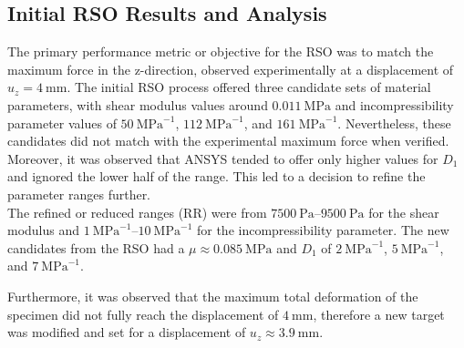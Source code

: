 \subsection*{Initial RSO Results and Analysis}
The primary performance metric or objective for the RSO was to match the maximum force in the z-direction, 
observed experimentally at a displacement of $u_z=\SI{4}{\milli\meter}$.
The initial RSO process offered three candidate sets of material parameters, with shear modulus values 
around $\SI{0.011}{\mega \pascal}$ and incompressibility parameter values of $\SI{50}{\mega\pascal\tothe{-1}}$, 
$\SI{112}{\mega\pascal\tothe{-1}}$, and $\SI{161}{\mega\pascal\tothe{-1}}$. Nevertheless, these candidates 
did not match with the experimental maximum force when verified. Moreover, it was observed that ANSYS 
tended to offer only higher values for $D_1$ and ignored the lower half of the range. This led to a decision to 
refine the parameter ranges further.\\

The refined or reduced ranges (RR) were from $\SIrange{7500}{9500}{\pascal}$ for the shear modulus and 
$\SIrange{1}{10}{\mega\pascal\tothe{-1}}$ for the incompressibility parameter. The new candidates from the RSO had a 
$\mu \approx \SI{0.085}{\mega \pascal}$ and $D_1$ of $\SI{2}{\mega\pascal\tothe{-1}}$, 
$\SI{5}{\mega\pascal\tothe{-1}}$, and $\SI{7}{\mega\pascal\tothe{-1}}$. 

Furthermore, it was observed that the maximum total deformation of the specimen did not fully reach the  
displacement of $\SI{4}{\milli\meter}$, therefore a new target was modified and set for a displacement 
of $u_z\approx\SI{3.9}{\milli\meter}$.

